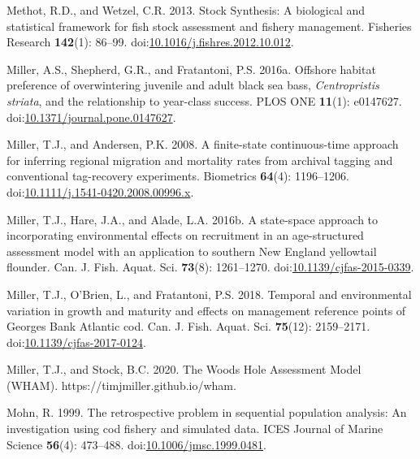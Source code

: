 \documentclass[
]{article}
\newlength{\cslhangindent}
\newlength{\cslentryspacingunit} %
\newenvironment{CSLReferences}[2] %
 {%
  \setlength{\parindent}{0pt}
  \ifodd #1
  \let\oldpar\par
  \def\par{\hangindent=\cslhangindent\oldpar}
  \fi
  \setlength{\parskip}{#2\cslentryspacingunit}
 }%
 {}
\begin{document}
\begin{CSLReferences}{1}{0}
\leavevmode{}%
Methot, R.D., and Wetzel, C.R. 2013. Stock {S}ynthesis: A biological and
statistical framework for fish stock assessment and fishery management.
Fisheries Research \textbf{142}(1): 86--99.
doi:\href{https://doi.org/10.1016/j.fishres.2012.10.012}{10.1016/j.fishres.2012.10.012}.

\leavevmode{}%
Miller, A.S., Shepherd, G.R., and Fratantoni, P.S. 2016a. Offshore
habitat preference of overwintering juvenile and adult black sea bass,
\emph{{C}entropristis} \emph{striata}, and the relationship to
year-class success. {PLOS} {ONE} \textbf{11}(1): e0147627.
doi:\href{https://doi.org/10.1371/journal.pone.0147627}{10.1371/journal.pone.0147627}.

\leavevmode{}%
Miller, T.J., and Andersen, P.K. 2008. A finite-state continuous-time
approach for inferring regional migration and mortality rates from
archival tagging and conventional tag-recovery experiments. Biometrics
\textbf{64}(4): 1196--1206.
doi:\href{https://doi.org/10.1111/j.1541-0420.2008.00996.x}{10.1111/j.1541-0420.2008.00996.x}.

\leavevmode{}%
Miller, T.J., Hare, J.A., and Alade, L.A. 2016b. A state-space approach
to incorporating environmental effects on recruitment in an
age-structured assessment model with an application to southern {New
England} yellowtail flounder. Can. J. Fish. Aquat. Sci. \textbf{73}(8):
1261--1270.
doi:\href{https://doi.org/10.1139/cjfas-2015-0339}{10.1139/cjfas-2015-0339}.

\leavevmode{}%
Miller, T.J., O'Brien, L., and Fratantoni, P.S. 2018. Temporal and
environmental variation in growth and maturity and effects on management
reference points of {Georges Bank Atlantic} cod. Can. J. Fish. Aquat.
Sci. \textbf{75}(12): 2159--2171.
doi:\href{https://doi.org/10.1139/cjfas-2017-0124}{10.1139/cjfas-2017-0124}.

\leavevmode{}%
Miller, T.J., and Stock, B.C. 2020. The {Woods Hole Assessment Model}
({WHAM}). https://timjmiller.github.io/wham.

\leavevmode{}%
Mohn, R. 1999. The retrospective problem in sequential population
analysis: An investigation using cod fishery and simulated data. ICES
Journal of Marine Science \textbf{56}(4): 473--488.
doi:\href{https://doi.org/10.1006/jmsc.1999.0481}{10.1006/jmsc.1999.0481}.


\end{CSLReferences}
\end{document}
